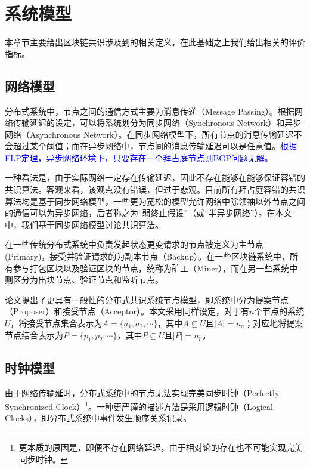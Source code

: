 \section{系统模型}
本章节主要给出区块链共识涉及到的相关定义，在此基础之上我们给出相关的评价指标。

\subsection{网络模型}
分布式系统中，节点之间的通信方式主要为消息传递（Message Passing）。根据网络传输延迟的设定，可以将系统划分为同步网络（Synchronous Network）和异步网络（Asynchronous Network）。在同步网络模型下，所有节点的消息传输延迟不会超过某个阈值；而在异步网络中，节点间的消息传输延迟可以是任意值。\textcolor{blue}{根据FLP定理\cite{fischer1982impossibility}，异步网络环境下，只要存在一个拜占庭节点则BGP问题无解。}

一种看法是，由于实际网络一定存在传输延迟，因此不存在能够在能够保证容错的共识算法。客观来看，该观点没有错误，但过于悲观。目前所有拜占庭容错的共识算法均是基于同步网络模型，一些更为宽松的模型允许网络中除领袖以外节点之间的通信可以为异步网络，后者称之为“弱终止假设”（或“半异步网络”）\cite{castro1999practical}。在本文中，我们基于同步网络模型讨论共识算法。

在一些传统分布式系统中负责发起状态更变请求的节点被定义为主节点(Primary)，接受并验证请求的为副本节点（Backup）\cite{lamport2001paxos,castro1999practical}。在一些区块链系统中，所有参与打包区块以及验证区块的节点，统称为矿工（Miner），而在另一些系统中则区分为出块节点、验证节点和监听节点\cite{ultrain2019}。

论文\cite{howard2019consensus}提出了更具有一般性的分布式共识系统节点模型，即系统中分为提案节点（Proposer）和接受节点（Acceptor）。本文采用同样设定，对于有$n$个节点的系统$U$，将接受节点集合表示为$A=\{a_1,a_2,\cdots\}$，其中$A\subseteq U$且$|A|=n_a$；对应地将提案节点结合表示为$P=\{p_1,p_2,\cdots\}$，其中$P\subseteq U$且$|P|=n_p$。


\subsection{时钟模型}

由于网络传输延时，分布式系统中的节点无法实现完美同步时钟（Perfectly Synchronized Clock）\footnote{更本质的原因是，即便不存在网络延迟，由于相对论的存在也不可能实现完美同步时钟。}。一种更严谨的描述方法是采用逻辑时钟（Logical Clocks）\cite{lamport1978time}，即分布式系统中事件发生顺序关系记录。

